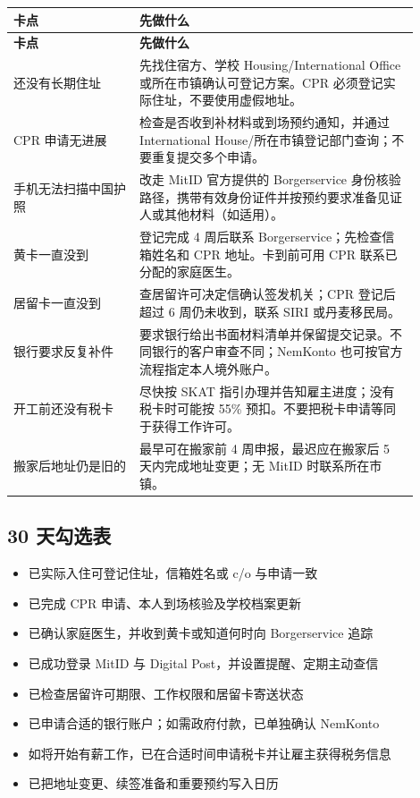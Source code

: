 \small
{}
\begin{longtable}{p{0.28\linewidth}p{0.62\linewidth}}
  \toprule
  \textbf{卡点} & \textbf{先做什么} \\
  \midrule
  \endfirsthead
  \toprule
  \textbf{卡点} & \textbf{先做什么} \\
  \midrule
  \endhead
  \bottomrule
  \endfoot
  还没有长期住址 & 先找住宿方、学校 Housing/International Office 或所在市镇确认可登记方案。CPR 必须登记实际住址，不要使用虚假地址。 \\
  CPR 申请无进展 & 检查是否收到补材料或到场预约通知，并通过 International House/所在市镇登记部门查询；不要重复提交多个申请。 \\
  手机无法扫描中国护照 & 改走 MitID 官方提供的 Borgerservice 身份核验路径，携带有效身份证件并按预约要求准备见证人或其他材料（如适用）。 \\
  黄卡一直没到 & 登记完成 4 周后联系 Borgerservice；先检查信箱姓名和 CPR 地址。卡到前可用 CPR 联系已分配的家庭医生。 \\
  居留卡一直没到 & 查居留许可决定信确认签发机关；CPR 登记后超过 6 周仍未收到，联系 SIRI 或丹麦移民局。 \\
  银行要求反复补件 & 要求银行给出书面材料清单并保留提交记录。不同银行的客户审查不同；NemKonto 也可按官方流程指定本人境外账户。 \\
  开工前还没有税卡 & 尽快按 SKAT 指引办理并告知雇主进度；没有税卡时可能按 55\% 预扣。不要把税卡申请等同于获得工作许可。 \\
  搬家后地址仍是旧的 & 最早可在搬家前 4 周申报，最迟应在搬家后 5 天内完成地址变更；无 MitID 时联系所在市镇。 \\
\end{longtable}
\normalsize

\subsection{30 天勾选表}

\begin{itemize}[label=$\bigcirc$,leftmargin=2.2em,itemsep=3pt]
  \item 已实际入住可登记住址，信箱姓名或 c/o 与申请一致
  \item 已完成 CPR 申请、本人到场核验及学校档案更新
  \item 已确认家庭医生，并收到黄卡或知道何时向 Borgerservice 追踪
  \item 已成功登录 MitID 与 Digital Post，并设置提醒、定期主动查信
  \item 已检查居留许可期限、工作权限和居留卡寄送状态
  \item 已申请合适的银行账户；如需政府付款，已单独确认 NemKonto
  \item 如将开始有薪工作，已在合适时间申请税卡并让雇主获得税务信息
  \item 已把地址变更、续签准备和重要预约写入日历
\end{itemize}

